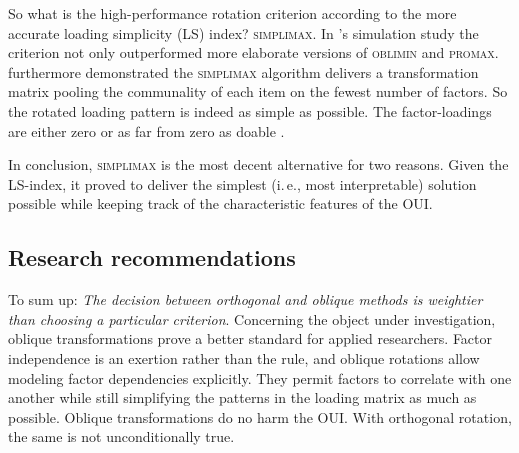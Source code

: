 \documentclass[jou, 11pt]{apa7}
\begin{document}
So what is the high-performance rotation criterion according to the more
accurate loading simplicity (LS) index?
\textsc{simplimax}\parencite{Kiers1994}. In \textcite{Lorenzo-Seva2003}'s
simulation study the criterion not only outperformed more elaborate versions of
\textsc{oblimin} and \textsc{promax}. \textcite{Lorenzo-Seva2003} furthermore
demonstrated the \textsc{simplimax} algorithm delivers a transformation matrix
pooling the communality of each item on the fewest number of factors. So the
rotated loading pattern is indeed as simple as possible. The factor-loadings
are either zero or as far from zero as doable . 

In conclusion, \textsc{simplimax} is the most decent alternative for two
reasons. Given the LS-index, it proved to deliver the simplest (i.\,e., most
interpretable) solution possible while keeping track of the characteristic
features of the OUI.

\subsection{Research recommendations}

To sum up: \textit{The decision between orthogonal and oblique methods is
weightier than choosing a particular criterion}. Concerning the object under
investigation, oblique transformations prove a better standard for applied
researchers. Factor independence is an exertion rather than the rule, and
oblique rotations allow modeling factor dependencies explicitly. They permit
factors to correlate with one another while still simplifying the patterns in
the loading matrix as much as possible. Oblique transformations do no harm the
OUI. With orthogonal rotation, the same is not unconditionally true.
\end{document}

